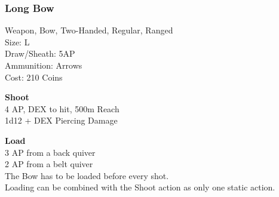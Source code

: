 \subsubsection{Long Bow}\label{weapon:longBow}
Weapon, Bow, Two-Handed, Regular, Ranged\\
Size: L\\
Draw/Sheath: 5AP\\
Ammunition: Arrows\\
Cost: 210 Coins

\textbf{Shoot}\\
4 AP, DEX to hit, 500m Reach\\
1d12 + \texttimes DEX Piercing Damage

\textbf{Load}\\
3 AP from a back quiver\\
2 AP from a belt quiver\\
The Bow has to be loaded before every shot.\\
Loading can be combined with the Shoot action as only one static action.